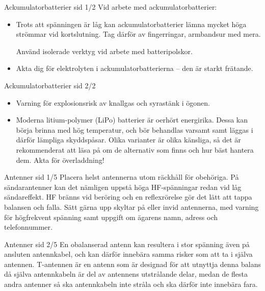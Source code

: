 \documentclass{beamer}
\begin{document}
\begin{frame}{Ackumulatorbatterier sid 1/2}
Vid arbete med ackumulatorbatterier:

\begin{itemize}
	\item Trots att spänningen är låg kan ackumulatorbatterier lämna
	mycket höga strömmar vid kortslutning.
	Tag därför av fingerringar, armbandsur med mera.
	
	Använd isolerade verktyg vid arbete med batteripolskor.
	\item Akta dig för elektrolyten i ackumulatorbatterierna -- den är
	starkt frätande.
\end{itemize}
\end{frame}

\begin{frame}{Ackumulatorbatterier sid 2/2}
\begin{itemize}
	\item Varning för explosionsrisk av knallgas och syrastänk i ögonen.
	\item Moderna litium-polymer (LiPo) batterier är oerhört energirika.
	Dessa kan börja brinna med hög temperatur, och bör behandlas varsamt samt
	läggas i därför lämpliga skyddspåsar.
	Olika varianter är olika känsliga, så det är rekommenderat att läsa på om
	de alternativ som finns och hur bäst hantera dem.
	Akta för överladdning!
\end{itemize}
\end{frame}

\begin{frame}{Antenner sid 1/5}
Placera helst antennerna utom räckhåll för obehöriga.
På sändarantenner kan det nämligen uppstå höga HF-spänningar redan vid
låg sändareffekt.
HF bränns vid beröring och en reflexrörelse gör det lätt att tappa balansen och
falla.
Sätt gärna upp skyltar på eller invid antennerna, med varning för högfrekvent
spänning samt uppgift om ägarens namn, adress och telefonnummer.
\end{frame}

\begin{frame}{Antenner sid 2/5}
En obalanserad antenn kan resultera i stor spänning även på ansluten
antennkabel, och kan därför innebära samma risker som att ta i själva antennen.
T-antennen är en antenn som är designad för att utnyttja denna balans då själva
antennkabeln är del av antennens utstrålande delar, medan de flesta andra
antenner så ska antennkabeln inte stråla och ska därför inte innebära fara.
\end{frame}
\end{document}
